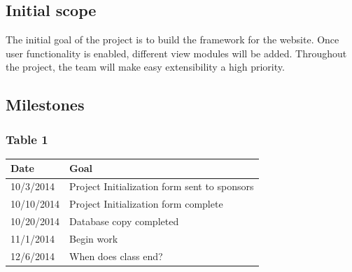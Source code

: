 \documentclass[12pt]{article}
\begin{document}
\begin{spacing}{1.5}
\subsection{Initial scope}
The initial goal of the project is to build the framework for the website. Once user functionality is enabled, different view modules will be added. Throughout the project, the team will make easy extensibility a high priority.

\subsection{Milestones}
\subsubsection{Table 1}
\begin{tabular}{l | l}
Date			&	Goal \\
\hline
10/3/2014		&	Project Initialization form sent to sponsors \\
\hline
10/10/2014		&	Project Initialization form complete \\
\hline
10/20/2014		&	Database copy completed \\
\hline
11/1/2014		&	Begin work \\
\hline
12/6/2014		&	When does class end? \\
\end{tabular}

\end{spacing}
\end{document}
